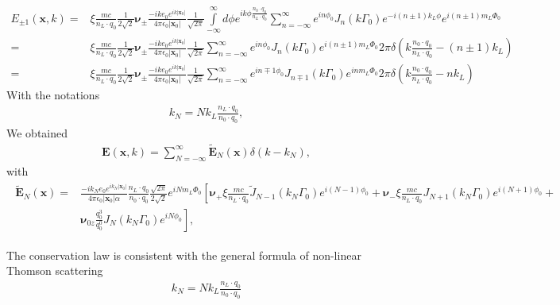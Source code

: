 \begin{align}
  E_{\pm1}({\bm x},k) = & \xi\frac{mc}{n_L\cdot q_0}\frac1{2\sqrt{2}}{\boldsymbol{\nu}_{\pm}}   \frac{-i k e_0 e^{ik |{\bm x}_0|}}{4\pi\epsilon_0|{\bm x}_0|}\frac1{\sqrt{2\pi}}\int\limits_{-\infty}^{\infty}d\phi  e^{ik\phi\frac{n_0\cdot q_0}{n_L\cdot q_0}}\sum\limits_{n=-\infty}^{\infty}e^{in\phi_0}J_n(k\Gamma_0)e^{-i(n\pm1)k_L\phi}e^{i(n\pm1)m_L\varPhi_0}\nonumber          \\
  = & \xi\frac{mc}{n_L\cdot q_0}\frac1{2\sqrt{2}}{\boldsymbol{\nu}_{\pm}}   \frac{-i k e_0 e^{ik |{\bm x}_0|}}{4\pi\epsilon_0|{\bm x}_0|}\frac1{\sqrt{2\pi}}\sum\limits_{n=-\infty}^{\infty}e^{in\phi_0}J_n(k\Gamma_0)e^{i(n\pm1)m_L\varPhi_0}2\pi\delta(k\frac{n_0\cdot q_0}{n_L\cdot q_0}-(n\pm1)k_L)\nonumber          \\
  =& \xi\frac{mc}{n_L\cdot q_0}\frac1{2\sqrt{2}}{\boldsymbol{\nu}_{\pm}}   \frac{-i k e_0 e^{ik |{\bm x}_0|}}{4\pi\epsilon_0|{\bm x}_0|}\frac1{\sqrt{2\pi}}\sum\limits_{n=-\infty}^{\infty}e^{i{n\mp1}\phi_0}J_{n\mp1}(k\Gamma_0)e^{inm_L\varPhi_0}2\pi\delta(k\frac{n_0\cdot q_0}{n_L\cdot q_0}-nk_L)
\end{align}
With the notations
\begin{align}
  k_N = Nk_L\frac{n_L\cdot q_0}{n_0\cdot q_0},
\end{align}We obtained
\begin{align}
  \boxed{
    {\bm E}({\bm x},k)=\sum\limits_{N=-\infty}^{\infty}\tilde{\bm E}_N({\bm x})\delta(k-k_N),\label{Encirc-1}
  }
\end{align}
with
\begin{align}
  \boxed{
    \begin{aligned}
      \tilde{\bm E}_N({\bm x}) = & \frac{-i k_N  e_0 e^{ik_N |{\bm x}_0|}}{4\pi\epsilon_0|{\bm x}_0|\alpha}\frac{n_L\cdot q_0}{n_0\cdot q_0}\frac{\sqrt{2\pi}}{2\sqrt{2}}e^{iNm_L\varPhi_0}\left[{\boldsymbol{\nu}}_{+}\xi\frac{mc}{n_L\cdot q_0}\tilde J_{N-1}(k_N\Gamma_0)e^{i(N-1)\phi_0}+{\boldsymbol{\nu}}_{-}\xi\frac{mc}{n_L\cdot q_0}J_{N+1}(k_N\Gamma_0)e^{i(N+1)\phi_0}+\right.\nonumber \\
      & \left.{\boldsymbol{\nu}}_{0z}\frac{q_0^3}{q_0^0}J_N(k_N\Gamma_0)e^{iN\phi_0}\right],
    \end{aligned}
  }
\end{align}

The conservation law is consistent with the general formula of non-linear Thomson scattering
\begin{align}
  k_N = N k_L\frac{n_L\cdot q_0}{n_0\cdot q_0}
\end{align}

